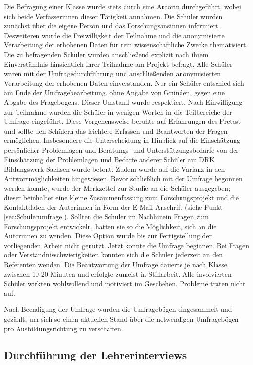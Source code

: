 Die Befragung einer Klasse wurde stets durch eine Autorin durchgeführt, wobei sich beide Verfasserinnen dieser Tätigkeit annahmen.
Die Schüler wurden zunächst über die eigene Person und das Forschungsansinnen informiert. Desweiteren wurde die Freiwilligkeit der Teilnahme und die anonymisierte Verarbeitung der erhobenen Daten für rein wissenschaftliche Zwecke thematisiert. Die zu befragenden Schüler wurden anschließend explizit nach ihrem Einverständnis hinsichtlich ihrer Teilnahme am Projekt befragt. Alle Schüler waren mit der Umfragedurchführung und anschließenden anonymisierten Verarbeitung der erhobenen Daten einverstanden. Nur ein Schüler entschied sich am Ende der Umfragebearbeitung, ohne Angabe von Gründen, gegen eine Abgabe des Fragebogens. Dieser Umstand wurde respektiert. Nach Einwilligung zur Teilnahme wurden die Schüler in wenigen Worten in die Teilbereiche der Umfrage eingeführt. Diese Vorgehensweise beruhte auf Erfahrungen des Pretest und sollte den Schülern das leichtere Erfassen und Beantworten der Fragen ermöglichen. Insbesondere die Unterscheidung in Hinblick auf die Einschätzung persönlicher Problemlagen und Beratungs- und Unterstützungsbedarfe von der Einschätzung der Problemlagen und Bedarfe anderer Schüler am DRK Bildungswerk Sachsen wurde betont. Zudem wurde auf die Varianz in den Antwortmöglichkeiten hingewiesen. Bevor schließlich mit der Umfrage begonnen werden konnte, wurde der Merkzettel zur Studie an die Schüler ausgegeben; dieser beinhaltet eine kleine Zusammenfassung zum Forschungsprojekt und die Kontaktdaten der Autorinnen in Form der E-Mail-Anschrift (siehe Punkt \ref{sec:Schülerumfrage}). Sollten die Schüler im Nachhinein Fragen zum Forschungsprojekt entwickeln, hatten sie so die Möglichkeit, sich an die Autorinnen zu wenden. Diese Option wurde bis zur Fertigstellung der vorliegenden Arbeit nicht genutzt. Jetzt konnte die Umfrage beginnen. Bei Fragen oder Verständnisschwierigkeiten konnten sich die Schüler jederzeit an den Referenten wenden. Die Beantwortung der Umfrage dauerte je nach Klasse zwischen 10-20 Minuten und erfolgte zumeist in Stillarbeit. Alle involvierten Schüler wirkten wohlwollend und motiviert im Geschehen. Probleme traten nicht auf.

Nach Beendigung der Umfrage wurden die Umfragebögen eingesammelt und gezählt, um sich so einen aktuellen Stand über die notwendigen Umfragebögen pro Ausbildungsrichtung zu verschaffen.

\subsection{Durchführung der Lehrerinterviews}
\label{sec:DurchführungDerLehrerinterviews}

